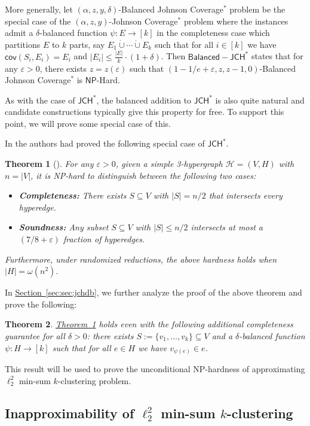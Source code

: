 \documentclass[10pt,a4paper]{amsart}
\newtheorem{theorem}{Theorem}[section]
\newcommand{\namedref}[2]{\hyperref[#2]{#1~\ref*{#2}}}
\newcommand{\thmlab}[1]{\label{thm:#1}}
\newcommand{\thmref}[1]{\namedref{Theorem}{thm:#1}}
\newcommand{\seclab}[1]{\label{sec:#1}}
\newcommand{\secref}[1]{\namedref{Section}{sec:#1}}
\newcommand{\eps}{\varepsilon}
\newcommand{\con}{\mathsf{cov}}
\newcommand{\JCHD}{$\mathsf{JCH}^*$\xspace}
\newcommand{\JCHDB}{$\mathsf{Balanced-JCH}^*$\xspace}
\newcommand{\jcd}{Johnson Coverage$^*$\xspace}
\newcommand{\jcdb}{Balanced Johnson Coverage$^*$\xspace}
\newcommand{\NP}{$\mathsf{NP}$\xspace}
\begin{document}
More generally, let $(\alpha, z, y,\delta)$-\jcdb problem be the special case of the 
$(\alpha, z, y)$-\jcd problem where the instances admit a $\delta$-balanced function $\psi:E\to [k]$ in the completeness case which  partitions $E$ to $k$ parts, say $E_1\dot\cup \cdots \dot\cup E_k$ such that for all $i\in[k]$ we have $\con(S_i,E_i)=E_i$ and $|E_i|\le \frac{|E|}{k}\cdot (1+\delta)$. 
Then \JCHDB states that for any $\eps > 0$, there exists $z = z(\eps)$ such that 
$(1-1/e + \eps, z, z-1,0)$-\jcdb is \NP-Hard.

As with the case of \JCHD, the balanced addition to \JCHD is also quite natural and candidate constructions typically give this property for free. To support this point, we will prove some special case of this. 


In \cite{Cohen-AddadSL22} the authors had proved the following special case of \JCHD. 


\begin{theorem}[\cite{Cohen-AddadSL22}]
\thmlab{thm:CKLNP}
For any $\eps > 0$, given a simple 3-hypergraph $\mathcal{H} = (V, H)$ with $n = |V|$, it is NP-hard to distinguish between the following two cases:
\label{thm:np-hard}
\begin{itemize}
\item {\bf Completeness:} There exists $S \subseteq V$ with $|S| = n/2$ that intersects every hyperedge. 
\item {\bf Soundness:} Any subset $S \subseteq V$ with $|S| \leq n/2$ intersects at most a $(7/8 + \eps)$ fraction of hyperedges. 
\end{itemize}
Furthermore, under randomized reductions, the above hardness holds when $|H| = \omega(n^2)$. 
\label{thm:hvc}
\end{theorem}

In \secref{sec:jchdb}, we further analyze the proof of the above theorem and prove the following:

\begin{theorem}
\thmlab{thm:minsumNP}
\thmref{thm:CKLNP} holds even with the following additional completeness guarantee for all $\delta>0$: there   exists $S:=\{v_1,\ldots ,v_k\}\subseteq  V$  and a $\delta$-balanced function $\psi:H\to [k]$ such that for all $e\in H$ we have $v_{\psi(e)}\in e$.
\end{theorem}

This result will be used to prove the unconditional NP-hardness of approximating $\ell_2^2$ min-sum $k$-clustering problem.

\subsection{Inapproximability of \texorpdfstring{$\ell_2^2$}{L22} min-sum \texorpdfstring{$k$}{k}-clustering}
\seclab{sec:inapprox}
 
\end{document}
